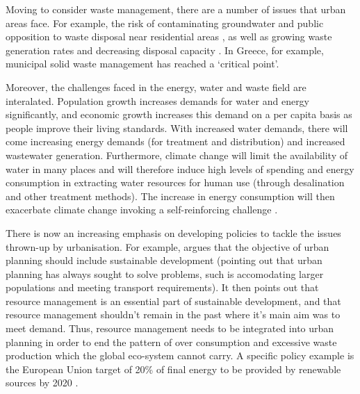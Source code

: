 Moving to consider waste management, there are a number of issues that urban areas face. For example, the risk of contaminating groundwater and public opposition to waste disposal near residential areas \citep{Li2006}, as well as growing waste generation rates and decreasing disposal capacity \citep{Lu2009}. In Greece, for example, municipal solid waste management has reached a `critical point'.

Moreover, the challenges faced in the energy, water and waste field are interalated. Population growth increases demands for water and energy significantly, and economic growth increases this demand on a per capita basis as people improve their living standards. With increased water demands, there will come increasing energy demands (for treatment and distribution) and increased wastewater generation. Furthermore, climate change will limit the availability of water in many places and will therefore induce high levels of spending and energy consumption in extracting water resources for human use (through desalination and other treatment methods). The increase in energy consumption will then exacerbate climate change invoking a self-reinforcing challenge \citet{Webber2011}.

There is now an increasing emphasis on developing policies to tackle the issues thrown-up by urbanisation. For example, \citet{Agudelo-Vera2011} argues that the objective of urban planning should include sustainable development (pointing out that urban planning has always sought to solve problems, such is accomodating larger populations and meeting transport requirements). It then points out that resource management is an essential part of sustainable development, and that resource management shouldn't remain in the past where it's main aim was to meet demand. Thus, resource management needs to be integrated into urban planning in order to end the pattern of over consumption and excessive waste production which the global eco-system cannot carry. A specific policy example is the European Union target of 20\% of final energy to be provided by renewable sources by 2020 \citep{Keirstead2012}.

